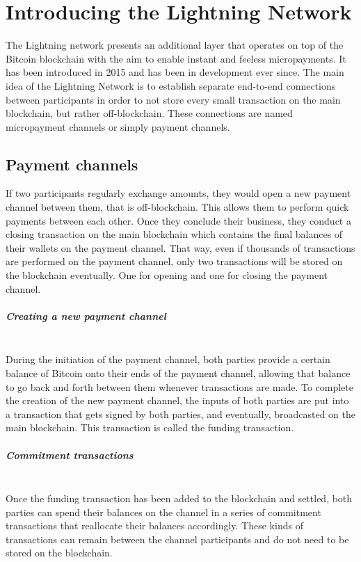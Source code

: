 \documentclass[a4paper, 12pt]{report}
\begin{document}
\chapter{Introducing the Lightning Network}
\par The Lightning network presents an additional layer that operates on top of the Bitcoin blockchain with the aim to enable instant and feeless micropayments. It has been introduced in 2015 and has been in development ever since. The main idea of the Lightning Network is to establish separate end-to-end connections between participants in order to not store every small transaction on the main blockchain, but rather off-blockchain. These connections are named micropayment channels or simply payment channels.

\section{Payment channels}
\par If two participants regularly exchange amounts, they would open a new payment channel between them, that is off-blockchain. This allows them to perform quick payments between each other. Once they conclude their business, they conduct a closing transaction on the main blockchain which contains the final balances of their wallets on the payment channel. That way, even if thousands of transactions are performed on the payment channel, only two transactions will be stored on the blockchain eventually. One for opening and one for closing the payment channel.

\paragraph{Creating a new payment channel} \hspace{0pt} \\
During the initiation of the payment channel, both parties provide a certain balance of Bitcoin onto their ends of the payment channel, allowing that balance to go back and forth between them whenever transactions are made. To complete the creation of the new payment channel, the inputs of both parties are put into a transaction that gets signed by both parties, and eventually, broadcasted on the main blockchain. This transaction is called the funding transaction.

\paragraph{Commitment transactions} \hspace{0pt} \\
Once the funding transaction has been added to the blockchain and settled, both parties can spend their balances on the channel in a series of commitment transactions that reallocate their balances accordingly. These kinds of transactions can remain between the channel participants and do not need to be stored on the blockchain.
\end{document}
